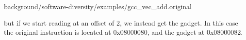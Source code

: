 
{background/software-diversity/examples/gcc_vec_add.original}

but if we start reading at an offset of 2, we instead get the gadget. In this case
the original instruction is located at 0x08000080, and the gadget at 0x08000082.

